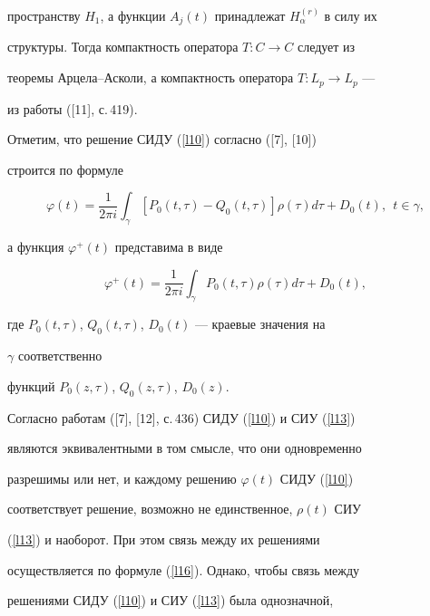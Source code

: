 пространству $H_1$, а функции $A_j(t)$ принадлежат $H_\alpha^{(r)}$ в силу их


структуры. Тогда компактность оператора $T:C\to C$ следует из


теоремы Арцела--Асколи, а компактность оператора $T:L_p\to L_p$ ---


из работы ([11], с.\,419).





Отметим, что решение СИДУ (\ref{l10}) согласно ([7], [10])


строится по формуле


\begin{equation}


\label{l16}


\varphi(t)=\frac{1}{2\pi i}\int_\gamma [P_0(t,\tau)-Q_0(t,\tau)]


\rho(\tau)d\tau + D_0(t),\ \ t\in\gamma,


\end{equation}


а функция $\varphi^+(t)$ представима в виде


\begin{equation}


\label{l17}


\varphi^+(t)=\frac{1}{2\pi i}\int_\gamma P_0(t,\tau)\rho(\tau)d\tau + D_0(t),


\end{equation}


где $P_0(t,\tau)$, $Q_0(t,\tau)$, $D_0(t)$ --- краевые значения на 


$\gamma$ соответственно


функций $P_0(z,\tau)$, $Q_0(z,\tau)$, $D_0(z)$.





Согласно работам ([7], [12], с.\,436) СИДУ (\ref{l10}) и СИУ (\ref{l13})


являются эквивалентными в том смысле, что они одновременно


разрешимы или нет, и каждому решению $\varphi(t)$ СИДУ (\ref{l10})


соответствует решение, возможно  не единственное, $\rho(t)$ СИУ


(\ref{l13}) и наоборот. При этом связь между их решениями


осуществляется по формуле (\ref{l16}). Однако, чтобы связь между


решениями СИДУ (\ref{l10}) и СИУ (\ref{l13}) была однозначной,


